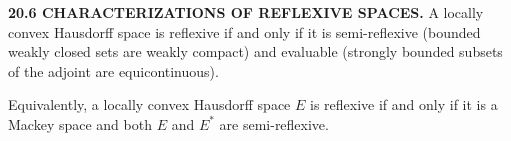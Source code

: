 \textbf{20.6 CHARACTERIZATIONS OF REFLEXIVE SPACES.}
A locally convex Hausdorff space is reflexive if and only if it is semi-reflexive (bounded weakly closed sets are weakly compact) and evaluable (strongly bounded subsets of the adjoint are equicontinuous).

Equivalently, a locally convex Hausdorff space $E$ is reflexive if and only if it is a Mackey space and both $E$ and $E^*$ are semi-reflexive.
